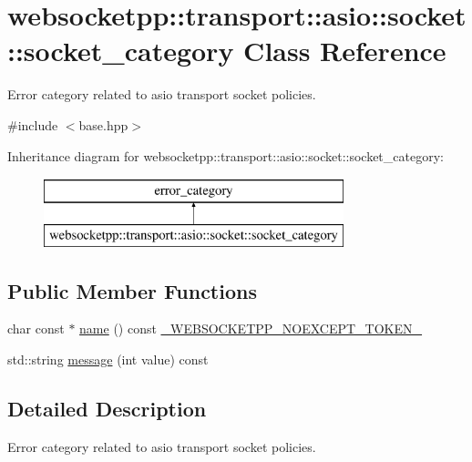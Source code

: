 \hypertarget{classwebsocketpp_1_1transport_1_1asio_1_1socket_1_1socket__category}{}\section{websocketpp\+:\+:transport\+:\+:asio\+:\+:socket\+:\+:socket\+\_\+category Class Reference}
\label{classwebsocketpp_1_1transport_1_1asio_1_1socket_1_1socket__category}


Error category related to asio transport socket policies.  




{\ttfamily \#include $<$base.\+hpp$>$}

Inheritance diagram for websocketpp\+:\+:transport\+:\+:asio\+:\+:socket\+:\+:socket\+\_\+category\+:\begin{figure}[H]
\begin{center}
\leavevmode
\includegraphics[height=2.000000cm]{classwebsocketpp_1_1transport_1_1asio_1_1socket_1_1socket__category}
\end{center}
\end{figure}
\subsection*{Public Member Functions}
\begin{DoxyCompactItemize}
\item 
char const $\ast$ \hyperlink{classwebsocketpp_1_1transport_1_1asio_1_1socket_1_1socket__category_aae34251fd85287d7acc17a7ed6a5c79e}{name} () const \hyperlink{boost__config_8hpp_aa19747404a5f2fe9c9eb9e9d2e48f26c}{\+\_\+\+W\+E\+B\+S\+O\+C\+K\+E\+T\+P\+P\+\_\+\+N\+O\+E\+X\+C\+E\+P\+T\+\_\+\+T\+O\+K\+E\+N\+\_\+}
\item 
std\+::string \hyperlink{classwebsocketpp_1_1transport_1_1asio_1_1socket_1_1socket__category_abb1f4d24cbe20679b892a184b585f3dd}{message} (int value) const 
\end{DoxyCompactItemize}


\subsection{Detailed Description}
Error category related to asio transport socket policies. 

